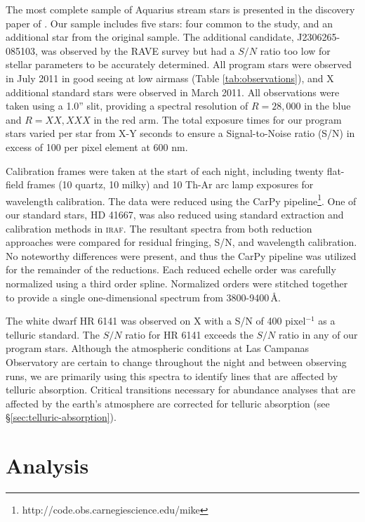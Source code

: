 \documentclass{emulateapj}
\begin{document}
The most complete sample of Aquarius stream stars is presented in the discovery paper of \citet{williams;et-al_2011}. Our sample includes five stars: four common to the \citet{wylie-de-boer;et-al_2012} study, and an additional star from the original \citet{williams;et-al_2011} sample. The additional candidate, J2306265-085103, was observed by the RAVE survey but had a $S/N$ ratio too low for stellar parameters to be accurately determined. All program stars were observed in July 2011 in good seeing at low airmass (Table \ref{tab:observations}), and X additional standard stars were observed in March 2011. All observations were taken using a 1.0'' slit, providing a spectral resolution of $R = 28,000$ in the blue and $R = XX,XXX$ in the red arm. The total exposure times for our program stars varied per star from X-Y seconds to ensure a Signal-to-Noise ratio (S/N) in excess of 100 per pixel element at 600 nm.


Calibration frames were taken at the start of each night, including twenty flat-field frames (10 quartz, 10 milky) and 10 Th-Ar arc lamp exposures for wavelength calibration. The data were reduced using the CarPy pipeline\footnote{http://code.obs.carnegiescience.edu/mike}. One of our standard stars, HD 41667, was also reduced using standard extraction and calibration methods in \textsc{iraf}. The resultant spectra from both reduction approaches were compared for residual fringing, S/N, and wavelength calibration. No noteworthy differences were present, and thus the CarPy pipeline was utilized for the remainder of the reductions. Each reduced echelle order was carefully normalized using a third order spline. Normalized orders   were stitched together to provide a single one-dimensional spectrum from 3800-9400\,\AA{}. 
 
The white dwarf HR 6141 was observed on X with a S/N of 400 pixel$^{-1}$ as a telluric standard. The $S/N$ ratio for HR 6141 exceeds the $S/N$ ratio in any of our program stars. Although the atmospheric conditions at Las Campanas Observatory are certain to change throughout the night and between observing runs, we are primarily using this spectra to identify lines that are affected by telluric absorption. Critical transitions necessary for abundance analyses that are affected by the earth's atmosphere are corrected for telluric absorption (see \S\ref{sec:telluric-absorption}).

\section{Analysis}
\label{sec:analysis}
\end{document}
